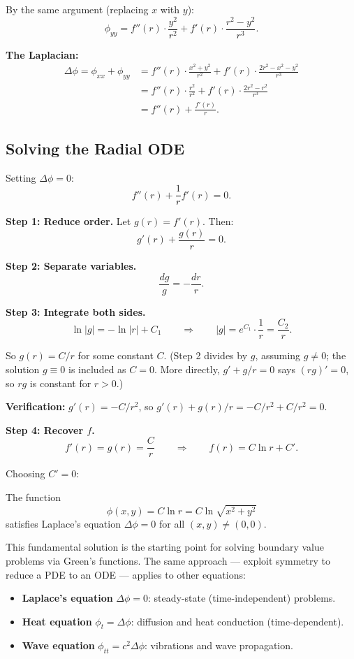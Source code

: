 \documentclass[11pt]{report}
\begin{document}
By the same argument (replacing $x$ with $y$):
\[
\phi_{yy} = f''(r) \cdot \frac{y^2}{r^2} + f'(r) \cdot \frac{r^2 - y^2}{r^3}.
\]

\textbf{The Laplacian:}
\begin{align*}
\Delta \phi = \phi_{xx} + \phi_{yy} &= f''(r) \cdot \frac{x^2 + y^2}{r^2} + f'(r) \cdot \frac{2r^2 - x^2 - y^2}{r^3} \\
&= f''(r) \cdot \frac{r^2}{r^2} + f'(r) \cdot \frac{2r^2 - r^2}{r^3} \\
&= f''(r) + \frac{f'(r)}{r}.
\end{align*}

\subsection*{Solving the Radial ODE}

Setting $\Delta \phi = 0$:
\[
f''(r) + \frac{1}{r} f'(r) = 0.
\]

\textbf{Step 1: Reduce order.} Let $g(r) = f'(r)$. Then:
\[
g'(r) + \frac{g(r)}{r} = 0.
\]

\textbf{Step 2: Separate variables.}
\[
\frac{dg}{g} = -\frac{dr}{r}.
\]

\textbf{Step 3: Integrate both sides.}
\[
\ln|g| = -\ln|r| + C_1 \qquad \Longrightarrow \qquad |g| = e^{C_1} \cdot \frac{1}{r} = \frac{C_2}{r}.
\]

So $g(r) = C/r$ for some constant $C$. (Step 2 divides by $g$, assuming $g \neq 0$; the solution $g \equiv 0$ is included as $C = 0$. More directly, $g' + g/r = 0$ says $(rg)' = 0$, so $rg$ is constant for $r > 0$.)

\textbf{Verification:} $g'(r) = -C/r^2$, so $g'(r) + g(r)/r = -C/r^2 + C/r^2 = 0$. \checkmark

\textbf{Step 4: Recover $f$.}
\[
f'(r) = g(r) = \frac{C}{r} \qquad \Longrightarrow \qquad f(r) = C \ln r + C'.
\]

Choosing $C' = 0$:

\begin{theorem}
The function
\[
\phi(x,y) = C \ln r = C \ln \sqrt{x^2 + y^2}
\]
satisfies Laplace's equation $\Delta \phi = 0$ for all $(x,y) \neq (0,0)$.
\end{theorem}

\begin{remark}
This fundamental solution is the starting point for solving boundary value problems via Green's functions. The same approach --- exploit symmetry to reduce a PDE to an ODE --- applies to other equations:
\begin{itemize}
    \item \textbf{Laplace's equation} $\Delta \phi = 0$: steady-state (time-independent) problems.
    \item \textbf{Heat equation} $\phi_t = \Delta \phi$: diffusion and heat conduction (time-dependent).
    \item \textbf{Wave equation} $\phi_{tt} = c^2 \Delta \phi$: vibrations and wave propagation.
\end{itemize}
\end{remark}
\end{document}
